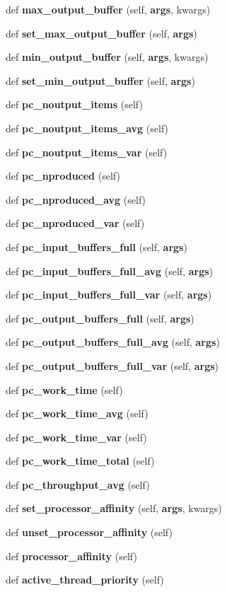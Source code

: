 \begin{DoxyCompactItemize}
\item 
def {\bf max\+\_\+output\+\_\+buffer} (self, {\bf args}, kwargs)
\item 
def {\bf set\+\_\+max\+\_\+output\+\_\+buffer} (self, {\bf args})
\item 
def {\bf min\+\_\+output\+\_\+buffer} (self, {\bf args}, kwargs)
\item 
def {\bf set\+\_\+min\+\_\+output\+\_\+buffer} (self, {\bf args})
\item 
def {\bf pc\+\_\+noutput\+\_\+items} (self)
\item 
def {\bf pc\+\_\+noutput\+\_\+items\+\_\+avg} (self)
\item 
def {\bf pc\+\_\+noutput\+\_\+items\+\_\+var} (self)
\item 
def {\bf pc\+\_\+nproduced} (self)
\item 
def {\bf pc\+\_\+nproduced\+\_\+avg} (self)
\item 
def {\bf pc\+\_\+nproduced\+\_\+var} (self)
\item 
def {\bf pc\+\_\+input\+\_\+buffers\+\_\+full} (self, {\bf args})
\item 
def {\bf pc\+\_\+input\+\_\+buffers\+\_\+full\+\_\+avg} (self, {\bf args})
\item 
def {\bf pc\+\_\+input\+\_\+buffers\+\_\+full\+\_\+var} (self, {\bf args})
\item 
def {\bf pc\+\_\+output\+\_\+buffers\+\_\+full} (self, {\bf args})
\item 
def {\bf pc\+\_\+output\+\_\+buffers\+\_\+full\+\_\+avg} (self, {\bf args})
\item 
def {\bf pc\+\_\+output\+\_\+buffers\+\_\+full\+\_\+var} (self, {\bf args})
\item 
def {\bf pc\+\_\+work\+\_\+time} (self)
\item 
def {\bf pc\+\_\+work\+\_\+time\+\_\+avg} (self)
\item 
def {\bf pc\+\_\+work\+\_\+time\+\_\+var} (self)
\item 
def {\bf pc\+\_\+work\+\_\+time\+\_\+total} (self)
\item 
def {\bf pc\+\_\+throughput\+\_\+avg} (self)
\item 
def {\bf set\+\_\+processor\+\_\+affinity} (self, {\bf args}, kwargs)
\item 
def {\bf unset\+\_\+processor\+\_\+affinity} (self)
\item 
def {\bf processor\+\_\+affinity} (self)
\item 
def {\bf active\+\_\+thread\+\_\+priority} (self)
\item 

\end{DoxyCompactItemize}
